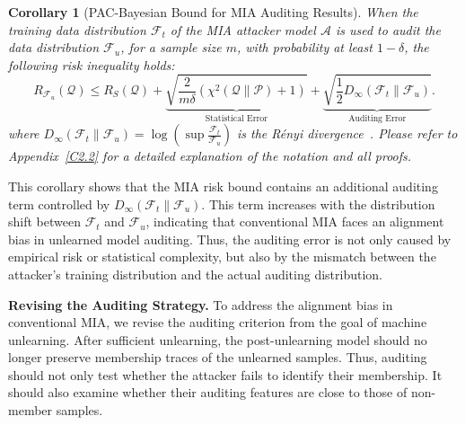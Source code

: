 \documentclass{article}
\theoremstyle{plain}
\newtheorem{corollary}[theorem]{Corollary}
\theoremstyle{definition}
\theoremstyle{remark}
\begin{document}
\begin{corollary}[PAC-Bayesian Bound for MIA Auditing Results]
    When the training data distribution $\mathcal F_t$ of the MIA attacker model $\mathcal A$ is used to audit the data distribution $\mathcal F_u$, for a sample size $m$, with probability at least $1-\delta$, the following risk inequality holds:
    \begin{equation}
        R_{\mathcal F_u}(\mathcal Q)
        \leq
        R_S(\mathcal Q)
        +
        \underbrace{
        \sqrt{
        \frac{2}{m\delta}
        \left(\chi^2(\mathcal Q \| \mathcal P)+1\right)
        }
        }_{\text{Statistical Error}}
        +
        \underbrace{
        \sqrt{
        \frac{1}{2}D_\infty(\mathcal F_t \| \mathcal F_u)
        }
        }_{\text{Auditing Error}} .
    \end{equation}
\label{coro}
where $D_\infty(\mathcal F_t \| \mathcal F_u)=\log\left(\sup \frac{\mathcal F_t}{\mathcal F_u}\right)$ is the Rényi divergence~\cite{duliang3}. Please refer to Appendix~\ref{C2.2} for a detailed explanation of the notation and all proofs.
\end{corollary}
This corollary shows that the MIA risk bound contains an additional auditing term controlled by $D_\infty(\mathcal F_t\|\mathcal F_u)$. This term increases with the distribution shift between $\mathcal F_t$ and $\mathcal F_u$, indicating that conventional MIA faces an alignment bias in unlearned model auditing. Thus, the auditing error is not only caused by empirical risk or statistical complexity, but also by the mismatch between the attacker’s training distribution and the actual auditing distribution.

\textbf{Revising the Auditing Strategy.}
To address the alignment bias in conventional MIA, we revise the auditing criterion from the goal of machine unlearning. After sufficient unlearning, the post-unlearning model should no longer preserve membership traces of the unlearned samples. Thus, auditing should not only test whether the attacker fails to identify their membership. It should also examine whether their auditing features are close to those of non-member samples.
\end{document}

